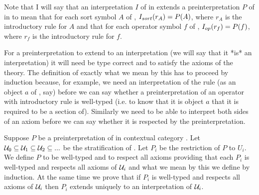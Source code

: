 Note that I will say that an interpretation $I$ of \gatUw in \catcw extends a preinterpretation $P$ of \gatUw in \catcw to mean that for each sort symbol $A$ of \gatU,
$I_{sort}(r_A) = P(A)$, where $r_A$ is the introductory rule for $A$ and that for each operator symbol
$f$ of \gatU,   $I_{op}(r_f) = P(f)$, where $r_f$ is the introductory rule for $f$.

\note
 For a preinterpretation to extend to an interpretation (we will say that it *is* an interpretation) 
it will need be type correct and to satisfy the axioms of the theory. The definition of exactly what we mean by this has to proceed by induction because, for example, we need an interpretation of the rule
 (as an object $a$ of \catc, say) before we can say whether a preinterpretation of an operator with introductory rule \genericfintroductoryrule
is well-typed (i.e. to know that it is object $a$ that it is required to be a section of).
Similarly we need to be able to interpret both sides of an axiom before we can say whether it is respected
by the preinterpretation. 

\note Suppose $P$ be a preinterpretation of \gatUw in contextual category \catc.
Let $\mathcal{U}_0 \subseteq \mathcal{U}_1 \subseteq \mathcal{U}_2 \subseteq ...$ be the stratification of \gatU. 
Let $P_i$ be the restriction of $P$ to $U_i$. 
We define $P$ to be well-typed and to respect all axioms 
providing that  each  $P_i$ is well-typed and respects all axioms of $\mathcal{U}_i$ and 
what we mean by this we define by induction. 
At the same time we prove that if $P_i$ is well-typed and respects all axioms of $\mathcal{U}_i$ then $P_i$
extends uniquely to an interpretation of $\mathcal{U}_i$.  

